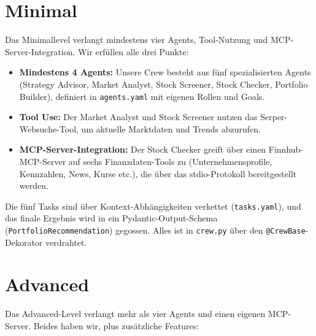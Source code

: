 \documentclass[conference]{IEEEtran}
\begin{document}
\section{Minimal}

Das Minimallevel verlangt mindestens vier Agents, Tool-Nutzung und
MCP-Server-Integration. Wir erfüllen alle drei Punkte:

\begin{itemize}
    \item \textbf{Mindestens 4 Agents:} Unsere Crew besteht aus fünf
          spezialisierten Agents (Strategy Advisor, Market Analyst,
          Stock Screener, Stock Checker, Portfolio Builder), definiert
          in \texttt{agents.yaml} mit eigenen Rollen und Goals.
    \item \textbf{Tool Use:} Der Market Analyst und Stock Screener
          nutzen das Serper-Websuche-Tool, um aktuelle Marktdaten und
          Trends abzurufen.
    \item \textbf{MCP-Server-Integration:} Der Stock Checker greift
          über einen Finnhub-MCP-Server auf sechs Finanzdaten-Tools zu
          (Unternehmensprofile, Kennzahlen, News, Kurse etc.), die über
          das stdio-Protokoll bereitgestellt werden.
\end{itemize}

Die fünf Tasks sind über Kontext-Abhängigkeiten verkettet
(\texttt{tasks.yaml}), und das finale Ergebnis wird in ein
Pydantic-Output-Schema (\texttt{PortfolioRecommendation}) gegossen.
Alles ist in \texttt{crew.py} über den \texttt{@CrewBase}-Dekorator
verdrahtet.

\section{Advanced}

Das Advanced-Level verlangt mehr als vier Agents und einen eigenen
MCP-Server. Beides haben wir, plus zusätzliche Features:
\end{document}
